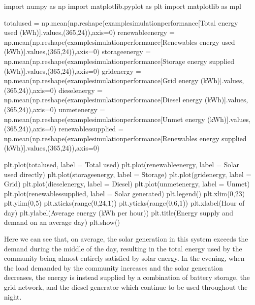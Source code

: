 \documentclass[letterpaper,10pt,english]{sphinxmanual}
\begin{document}
\begin{sphinxVerbatim}[commandchars=\\\{\}]
import numpy as np
import matplotlib.pyplot as plt
import matplotlib as mpl

total\PYGZus{}used = np.mean(np.reshape(example\PYGZus{}simulation\PYGZus{}performance[\PYGZsq{}Total energy used (kWh)\PYGZsq{}].values,(365,24)),axis=0)
renewable\PYGZus{}energy = np.mean(np.reshape(example\PYGZus{}simulation\PYGZus{}performance[\PYGZsq{}Renewables energy used (kWh)\PYGZsq{}].values,(365,24)),axis=0)
storage\PYGZus{}energy = np.mean(np.reshape(example\PYGZus{}simulation\PYGZus{}performance[\PYGZsq{}Storage energy supplied (kWh)\PYGZsq{}].values,(365,24)),axis=0)
grid\PYGZus{}energy = np.mean(np.reshape(example\PYGZus{}simulation\PYGZus{}performance[\PYGZsq{}Grid energy (kWh)\PYGZsq{}].values,(365,24)),axis=0)
diesel\PYGZus{}energy = np.mean(np.reshape(example\PYGZus{}simulation\PYGZus{}performance[\PYGZsq{}Diesel energy (kWh)\PYGZsq{}].values,(365,24)),axis=0)
unmet\PYGZus{}energy = np.mean(np.reshape(example\PYGZus{}simulation\PYGZus{}performance[\PYGZsq{}Unmet energy (kWh)\PYGZsq{}].values,(365,24)),axis=0)
renewables\PYGZus{}supplied = np.mean(np.reshape(example\PYGZus{}simulation\PYGZus{}performance[\PYGZsq{}Renewables energy supplied (kWh)\PYGZsq{}].values,(365,24)),axis=0)

plt.plot(total\PYGZus{}used, label = \PYGZsq{}Total used\PYGZsq{})
plt.plot(renewable\PYGZus{}energy, label = \PYGZsq{}Solar used directly\PYGZsq{})
plt.plot(storage\PYGZus{}energy, label = \PYGZsq{}Storage\PYGZsq{})
plt.plot(grid\PYGZus{}energy, label = \PYGZsq{}Grid\PYGZsq{})
plt.plot(diesel\PYGZus{}energy, label = \PYGZsq{}Diesel\PYGZsq{})
plt.plot(unmet\PYGZus{}energy, label = \PYGZsq{}Unmet\PYGZsq{})
plt.plot(renewables\PYGZus{}supplied, label = \PYGZsq{}Solar generated\PYGZsq{})
plt.legend()
plt.xlim(0,23)
plt.ylim(0,5)
plt.xticks(range(0,24,1))
plt.yticks(range(0,6,1))
plt.xlabel(\PYGZsq{}Hour of day\PYGZsq{})
plt.ylabel(\PYGZsq{}Average energy (kWh per hour)\PYGZsq{})
plt.title(\PYGZsq{}Energy supply and demand on an average day\PYGZsq{})
plt.show()
\end{sphinxVerbatim}

\noindent{}

\sphinxAtStartPar
Here we can see that, on average, the solar generation in this system
exceeds the demand during the middle of the day, resulting in the total
energy used by the community being almost entirely satisfied by solar
energy. In the evening, when the load demanded by the community
increases and the solar generation decreases, the energy is instead
supplied by a combination of battery storage, the grid network, and the
diesel generator which continue to be used throughout the night.
\end{document}
